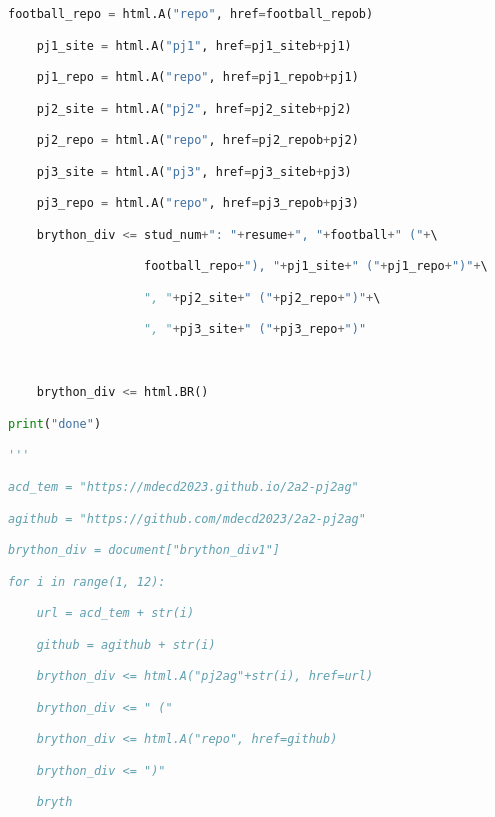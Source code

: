 \begin{lstlisting}[language=Python]
    football_repo = html.A("repo", href=football_repob) 

    pj1_site = html.A("pj1", href=pj1_siteb+pj1) 

    pj1_repo = html.A("repo", href=pj1_repob+pj1) 

    pj2_site = html.A("pj2", href=pj2_siteb+pj2) 

    pj2_repo = html.A("repo", href=pj2_repob+pj2) 

    pj3_site = html.A("pj3", href=pj3_siteb+pj3) 

    pj3_repo = html.A("repo", href=pj3_repob+pj3) 

    brython_div <= stud_num+": "+resume+", "+football+" ("+\ 

                   football_repo+"), "+pj1_site+" ("+pj1_repo+")"+\ 

                   ", "+pj2_site+" ("+pj2_repo+")"+\ 

                   ", "+pj3_site+" ("+pj3_repo+")" 

  

    brython_div <= html.BR() 

print("done") 

''' 

acd_tem = "https://mdecd2023.github.io/2a2-pj2ag" 

agithub = "https://github.com/mdecd2023/2a2-pj2ag" 

brython_div = document["brython_div1"] 

for i in range(1, 12): 

    url = acd_tem + str(i) 

    github = agithub + str(i) 

    brython_div <= html.A("pj2ag"+str(i), href=url) 

    brython_div <= " (" 

    brython_div <= html.A("repo", href=github) 

    brython_div <= ")" 

    bryth  
\end{lstlisting}
\newpage

